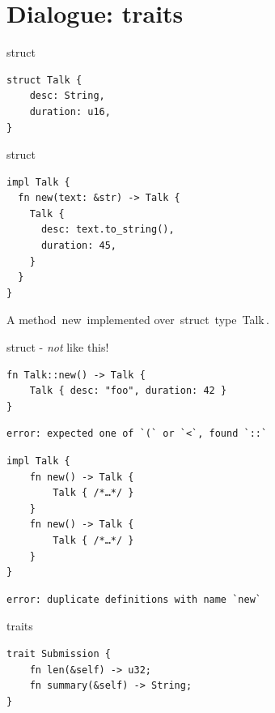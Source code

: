\documentclass{beamer}
\newcommand\code[1]{\,{\color[HTML]{884400}#1}\,}
\begin{document}

\section{Dialogue: traits}

\begin{frame}[fragile]{struct}
  \begin{verbatim}
struct Talk {
    desc: String,
    duration: u16,
}
  \end{verbatim}
\end{frame}

\begin{frame}[fragile]{struct}
  \begin{verbatim}
impl Talk {
  fn new(text: &str) -> Talk {
    Talk {
      desc: text.to_string(),
      duration: 45,
    }
  }
}
  \end{verbatim}
  A method \code{new} implemented over \code{struct} type \code{Talk}.
\end{frame}

\begin{frame}[fragile]{struct - \emph{not} like this!}
  \begin{verbatim}
fn Talk::new() -> Talk {
    Talk { desc: "foo", duration: 42 }
}
  \end{verbatim}
  \begin{verbatim}
error: expected one of `(` or `<`, found `::`
  \end{verbatim}
  \begin{verbatim}
impl Talk {
    fn new() -> Talk {
        Talk { /*…*/ }
    }
    fn new() -> Talk {
        Talk { /*…*/ }
    }
}
  \end{verbatim}
  \begin{verbatim}
error: duplicate definitions with name `new`
  \end{verbatim}
\end{frame}

\begin{frame}[fragile]{traits}
  \begin{verbatim}
trait Submission {
    fn len(&self) -> u32;
    fn summary(&self) -> String;
}
  \end{verbatim}
\end{frame}
\end{document}
